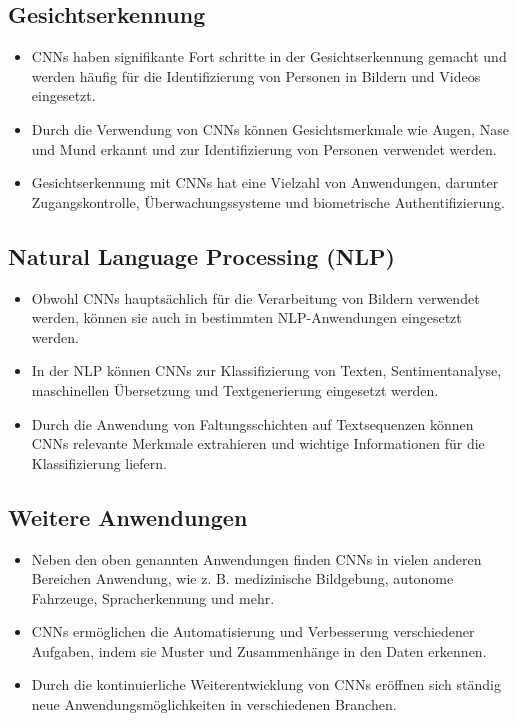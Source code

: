 \subsection{Gesichtserkennung}
\begin{itemize}
  \item CNNs haben signifikante Fort
  schritte in der Gesichtserkennung gemacht und werden häufig für die Identifizierung von Personen in Bildern und Videos eingesetzt.
  \item Durch die Verwendung von CNNs können Gesichtsmerkmale wie Augen, Nase und Mund erkannt und zur Identifizierung von Personen verwendet werden.
  \item Gesichtserkennung mit CNNs hat eine Vielzahl von Anwendungen, darunter Zugangskontrolle, Überwachungssysteme und biometrische Authentifizierung.
\end{itemize}

\subsection{Natural Language Processing (NLP)}
\begin{itemize}
  \item Obwohl CNNs hauptsächlich für die Verarbeitung von Bildern verwendet werden, können sie auch in bestimmten NLP-Anwendungen eingesetzt werden.
  \item In der NLP können CNNs zur Klassifizierung von Texten, Sentimentanalyse, maschinellen Übersetzung und Textgenerierung eingesetzt werden.
  \item Durch die Anwendung von Faltungsschichten auf Textsequenzen können CNNs relevante Merkmale extrahieren und wichtige Informationen für die Klassifizierung liefern.
\end{itemize}

\subsection{Weitere Anwendungen}
\begin{itemize}
  \item Neben den oben genannten Anwendungen finden CNNs in vielen anderen Bereichen Anwendung, wie z. B. medizinische Bildgebung, autonome Fahrzeuge, Spracherkennung und mehr.
  \item CNNs ermöglichen die Automatisierung und Verbesserung verschiedener Aufgaben, indem sie Muster und Zusammenhänge in den Daten erkennen.
  \item Durch die kontinuierliche Weiterentwicklung von CNNs eröffnen sich ständig neue Anwendungsmöglichkeiten in verschiedenen Branchen.
\end{itemize}

